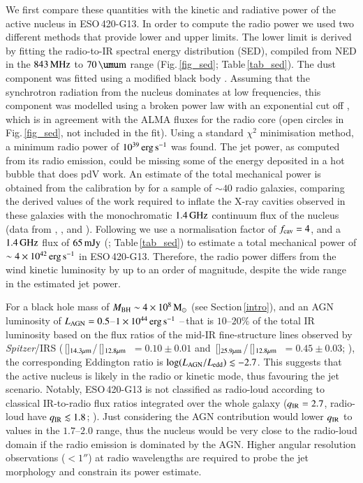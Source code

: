 \documentclass[longauth]{aa}
\newcommand{\nev}{\,\hbox{[\ion{Ne}{v}]$_{\rm 14.3 \mu m}$}}
\newcommand{\neii}{\,\hbox{[\ion{Ne}{ii}]$_{\rm 12.8 \mu m}$}}
\newcommand{\oiv}{\,\hbox{[\ion{O}{iv}]$_{\rm 25.9 \mu m}$}}
\def\micron{\hbox{$\umu$m}}
\begin{document}
We first compare these quantities with the kinetic and radiative power of the active nucleus in ESO\,420-G13. In order to compute the radio power we used two different methods that provide lower and upper limits. The lower limit is derived by fitting the radio-to-IR spectral energy distribution (SED), compiled from NED in the $843\, \rm{MHz}$ to $70\, \rm{\micron}$ range (Fig.\,\ref{fig_sed}; Table\,\ref{tab_sed}). The dust component was fitted using a modified black body . Assuming that the synchrotron radiation from the nucleus dominates at low frequencies, this component was modelled using a broken power law with an exponential cut off \citep{R&L04}, which is in agreement with the ALMA fluxes for the radio core (open circles in Fig.\,\ref{fig_sed}, not included in the fit). Using a standard $\chi^2$ minimisation method, a minimum radio power of $10^{39}\, \rm{erg\,s^{-1}}$ was found. The jet power, as computed from its radio emission, could be missing some of the energy deposited in a hot bubble that does pdV work. An estimate of the total mechanical power is obtained from the calibration by  for a sample of $\sim 40$ radio galaxies, comparing the derived values of the work required to inflate the X-ray cavities observed in these galaxies with the monochromatic $1.4\, \rm{GHz}$ continuum flux of the nucleus (data from , , and ). Following  we use a normalisation factor of $f_{\rm cav} = 4$, and a $1.4\, \rm{GHz}$ flux of $65\, \rm{mJy}$ (; Table\,\ref{tab_sed}) to estimate a total mechanical power of $\sim 4 \times 10^{42}\, \rm{erg\,s^{-1}}$ in ESO\,420-G13. Therefore, the radio power differs from the wind kinetic luminosity by up to an order of magnitude, despite the wide range in the estimated jet power.

For a black hole mass of $M_{\rm BH} \sim 4 \times 10^8\, \rm{M_\odot}$ (see Section\,\ref{intro}), and an AGN luminosity of $L_{\rm AGN} = 0.5$--$1 \times 10^{44}\, \rm{erg\,s^{-1}}$ --\,that is $10$--$20\%$ of the total IR luminosity based on the flux ratios of the mid-IR fine-structure lines observed by \textit{Spitzer}/IRS (\nev/\neii\ $= 0.10 \pm 0.01$ and \oiv/\neii \ $= 0.45 \pm 0.03$; ), the corresponding Eddington ratio is $\log(L_{\rm AGN}/L_{\rm edd}) \lesssim -2.7$. This suggests that the active nucleus is likely in the radio or kinetic mode, thus favouring the jet scenario. Notably, ESO\,420-G13 is not classified as radio-loud according to classical IR-to-radio flux ratios integrated over the whole galaxy ($q_{\rm IR} = 2.7$, radio-loud have $q_{\rm IR} \lesssim 1.8$; ). Just considering the AGN contribution would lower $q_{\rm IR}$ to values in the $1.7$--$2.0$ range, thus the nucleus would be very close to the radio-loud domain if the radio emission is dominated by the AGN. Higher angular resolution observations ($< 1''$) at radio wavelengths are required to probe the jet morphology and constrain its power estimate.
\end{document}
